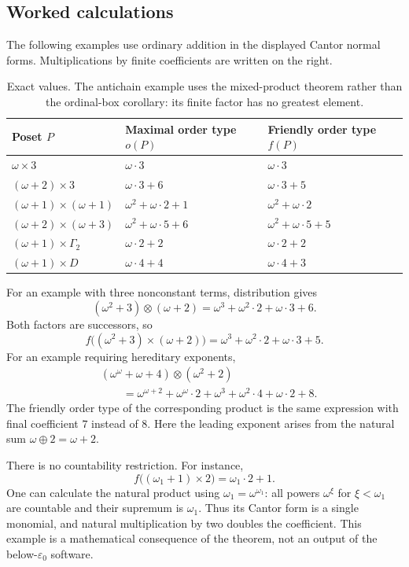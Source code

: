 \documentclass[11pt,letterpaper]{article}
\theoremstyle{definition}
\theoremstyle{remark}
\newcommand{\anti}[1]{\Gamma_{#1}}
\begin{document}
\subsection{Worked calculations}
The following examples use ordinary addition in the displayed Cantor
normal forms. Multiplications by finite coefficients are written on the
right.

\begin{table}[ht]
\centering\small
\renewcommand{\arraystretch}{1.3}
\begin{tabularx}{\textwidth}{@{}Y Y Y@{}}
\toprule
\textbf{Poset $P$} & \textbf{Maximal order type $o(P)$} & \textbf{Friendly order type $f(P)$}\\
\midrule
$\omega\times3$ & $\omega\cdot3$ & $\omega\cdot3$\\
$(\omega+2)\times3$ & $\omega\cdot3+6$ & $\omega\cdot3+5$\\
$(\omega+1)\times(\omega+1)$ & $\omega^2+\omega\cdot2+1$ & $\omega^2+\omega\cdot2$\\
$(\omega+2)\times(\omega+3)$ & $\omega^2+\omega\cdot5+6$ & $\omega^2+\omega\cdot5+5$\\
$(\omega+1)\times\anti2$ & $\omega\cdot2+2$ & $\omega\cdot2+2$\\
$(\omega+1)\times D$ & $\omega\cdot4+4$ & $\omega\cdot4+3$\\
\bottomrule
\end{tabularx}
\caption{Exact values. The antichain example uses the mixed-product
theorem rather than the ordinal-box corollary: its finite factor has no
greatest element.}
\label{tab:examples}
\end{table}

For an example with three nonconstant terms, distribution gives
\[
 (\omega^2+3)\otimes(\omega+2)
 =\omega^3+\omega^2\cdot2+\omega\cdot3+6.
\]
Both factors are successors, so
\[
 f\bigl((\omega^2+3)\times(\omega+2)\bigr)
 =\omega^3+\omega^2\cdot2+\omega\cdot3+5.
\]
For an example requiring hereditary exponents,
\begin{align*}
 &(\omega^\omega+\omega+4)\otimes(\omega^2+2)\\
 &\qquad=\omega^{\omega+2}+\omega^\omega\cdot2
       +\omega^3+\omega^2\cdot4+\omega\cdot2+8.
\end{align*}
The friendly order type of the corresponding product is the same expression
with final coefficient $7$ instead of $8$. Here the leading exponent
arises from the natural sum $\omega\oplus2=\omega+2$.

There is no countability restriction. For instance,
\[
 f\bigl((\omega_1+1)\times2\bigr)=\omega_1\cdot2+1.
\]
One can calculate the natural product using
$\omega_1=\omega^{\omega_1}$: all powers $\omega^\xi$ for $\xi<\omega_1$
are countable and their supremum is $\omega_1$. Thus its Cantor form is a
single monomial, and natural multiplication by two doubles the coefficient.
This example is a mathematical consequence of the theorem, not an output
of the below-$\varepsilon_0$ software.
\end{document}
